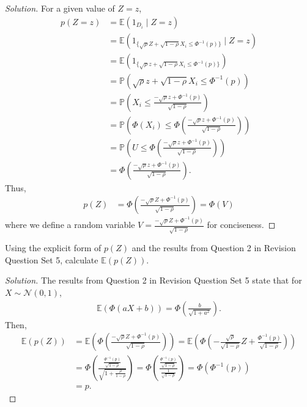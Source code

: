 \documentclass[10pt]{article}
\newcommand{\E}{\mathbb{E}}
\newenvironment{problem}[2][Problem]{\begin{trivlist}
\item[\hskip \labelsep {\bfseries #1}\hskip \labelsep {\bfseries #2.}]}{\end{trivlist}}
\begin{document}
\begin{proof}[Solution]
    For a given value of $Z = z$,
    \begin{align*}
        p(Z = z) &= \E(1_{D_i} \mid Z = z) \\
        &= \E \left( 1_{\{ \sqrt{\rho} Z + \sqrt{1 - \rho} X_i \leq \Phi^{-1}(p) \}} \mid Z = z \right) \\
        &= \E \left( 1_{\{ \sqrt{\rho} z + \sqrt{1 - \rho} X_i \leq \Phi^{-1}(p) \}} \right) \\
        &= \mathbb{P} \left( \sqrt{\rho} z + \sqrt{1 - \rho} X_i \leq \Phi^{-1}(p) \right) \\
        &= \mathbb{P} \left( X_i \leq \frac{-\sqrt{\rho} z + \Phi^{-1}(p)}{\sqrt{1 - \rho}} \right) \\
        &= \mathbb{P} \left( \Phi(X_i) \leq \Phi \left( \frac{-\sqrt{\rho} z + \Phi^{-1}(p)}{\sqrt{1 - \rho}} \right) \right) \\
        &= \mathbb{P} \left( U \leq \Phi \left( \frac{-\sqrt{\rho} z + \Phi^{-1}(p)}{\sqrt{1 - \rho}} \right) \right) \\
        &= \Phi \left( \frac{-\sqrt{\rho} z + \Phi^{-1}(p)}{\sqrt{1 - \rho}} \right).
    \end{align*}
    Thus,
    \begin{align*}
        p(Z) &= \Phi \left( \frac{-\sqrt{\rho} Z + \Phi^{-1}(p)}{\sqrt{1 - \rho}} \right) = \Phi(V)
    \end{align*}
    where we define a random variable $V = \frac{-\sqrt{\rho} Z + \Phi^{-1}(p)}{\sqrt{1 - \rho}}$ for conciseness.
\end{proof}



\begin{problem}{3}
    Using the explicit form of $p(Z)$ and the results from Question 2 in Revision Question Set 5, calculate $\E(p(Z))$.
\end{problem}

\begin{proof}[Solution]
    The results from Question 2 in Revision Question Set 5 state that for $X \sim \mathcal{N}(0,1)$, 
    \begin{align*}
        \E \left( \Phi(aX + b) \right) = \Phi \left( \frac{b}{\sqrt{1 + a^2}} \right).
    \end{align*}
    Then,
    \begin{align*}
        \E \left( p(Z) \right) &= \E \left( \Phi \left( \frac{-\sqrt{\rho} Z + \Phi^{-1}(p)}{\sqrt{1 - \rho}} \right) \right) = \E \left( \Phi \left( -\frac{\sqrt{\rho}}{\sqrt{1 - \rho}}Z + \frac{\Phi^{-1}(p)}{\sqrt{1 - \rho}} \right) \right) \\
        &= \Phi \left( \frac{\frac{\Phi^{-1}(p)}{\sqrt{1 - \rho}}}{\sqrt{1 + \frac{\rho}{1 - \rho}}} \right) = \Phi \left( \frac{\frac{\Phi^{-1}(p)}{\sqrt{1 - \rho}}}{\frac{1}{\sqrt{1 - \rho}}} \right) = \Phi \left( \Phi^{-1}(p) \right) \\
        &= p.
    \end{align*}
\end{proof}
\end{document}
